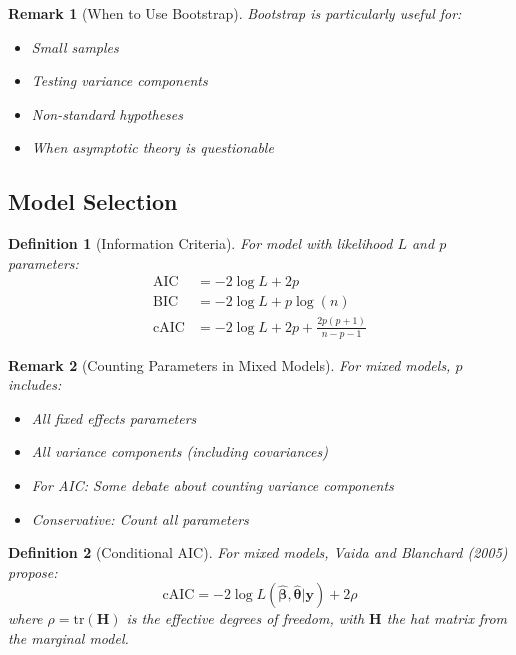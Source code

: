 \documentclass{article}
\newtheorem{definition}{Definition}
\newtheorem{remark}{Remark}
\begin{document}
\begin{remark}[When to Use Bootstrap]
Bootstrap is particularly useful for:
\begin{itemize}
    \item Small samples
    \item Testing variance components
    \item Non-standard hypotheses
    \item When asymptotic theory is questionable
\end{itemize}
\end{remark}

\subsection{Model Selection}

\begin{definition}[Information Criteria]
For model with likelihood $L$ and $p$ parameters:
\begin{align}
\text{AIC} &= -2\log L + 2p \\
\text{BIC} &= -2\log L + p\log(n) \\
\text{cAIC} &= -2\log L + 2p + \frac{2p(p+1)}{n-p-1}
\end{align}
\end{definition}

\begin{remark}[Counting Parameters in Mixed Models]
For mixed models, $p$ includes:
\begin{itemize}
    \item All fixed effects parameters
    \item All variance components (including covariances)
    \item For AIC: Some debate about counting variance components
    \item Conservative: Count all parameters
\end{itemize}
\end{remark}

\begin{definition}[Conditional AIC]
For mixed models, Vaida and Blanchard (2005) propose:
\begin{equation}
\text{cAIC} = -2\log L(\hat{\boldsymbol{\beta}}, \hat{\boldsymbol{\theta}}|\mathbf{y}) + 2\rho
\end{equation}
where $\rho = \text{tr}(\mathbf{H})$ is the effective degrees of freedom, with $\mathbf{H}$ the hat matrix from the marginal model.
\end{definition}
\end{document}
